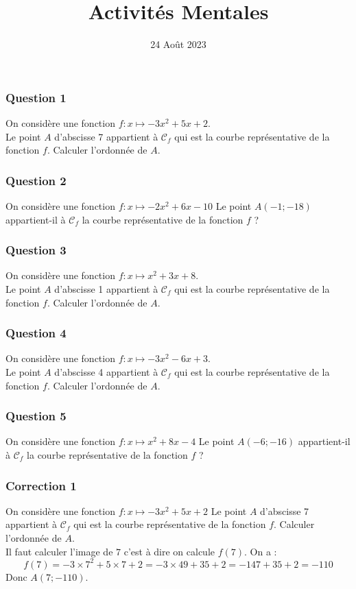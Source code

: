 \documentclass[15pt, mathserif]{beamer}
\title{Activités Mentales}
\date{24 Août 2023}
\begin{document}
\begin{frame}
    \titlepage
\end{frame}

\begin{frame} 
	\frametitle{Question 1}
On considère une fonction $f : x \mapsto -3x^2+5x+2$. \\ Le point $A$ d'abscisse 7 appartient à $\mathcal{C}_f$ qui est la courbe représentative de la fonction $f$. Calculer l'ordonnée de $A$.\end{frame}


\begin{frame} 
	\frametitle{Question 2}
On considère une fonction $f : x \mapsto -2x^2+6x-10$ Le point $A(-1;-18 )$ appartient-il à $\mathcal{C}_f$ la courbe représentative de la fonction $f$ ?\end{frame}


\begin{frame} 
	\frametitle{Question 3}
On considère une fonction $f : x \mapsto x^2+3x+8$. \\ Le point $A$ d'abscisse 1 appartient à $\mathcal{C}_f$ qui est la courbe représentative de la fonction $f$. Calculer l'ordonnée de $A$.\end{frame}


\begin{frame} 
	\frametitle{Question 4}
On considère une fonction $f : x \mapsto -3x^2-6x+3$. \\ Le point $A$ d'abscisse 4 appartient à $\mathcal{C}_f$ qui est la courbe représentative de la fonction $f$. Calculer l'ordonnée de $A$.\end{frame}


\begin{frame} 
	\frametitle{Question 5}
On considère une fonction $f : x \mapsto x^2+8x-4$ Le point $A(-6;-16 )$ appartient-il à $\mathcal{C}_f$ la courbe représentative de la fonction $f$ ?\end{frame}


\begin{frame}
\vspace{-10mm}
	\frametitle{Correction 1}
On considère une fonction $f : x \mapsto -3x^2+5x+2$ Le point $A$ d'abscisse 7 appartient à $\mathcal{C}_f$ qui est la courbe représentative de la fonction $f$. Calculer l'ordonnée de $A$. \\ Il faut calculer l'image de $7$ c'est à dire on calcule $f(7)$. On a : $$ f(7)=-3\times7^2+5\times7+2=-3\times49+35+2=-147+35+2=-110$$ Donc $A( 7;-110)$.\end{frame}
\end{document}
